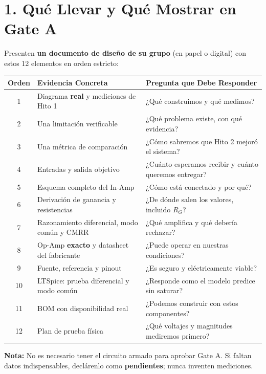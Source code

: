 \documentclass[10pt, a4paper]{article}
\begin{document}
\section*{1. Qué Llevar y Qué Mostrar en Gate A}
Presenten \textbf{un documento de diseño de su grupo} (en papel o digital) con estos 12 elementos en orden estricto:

\begin{table}[htbp]
    \centering
    \footnotesize
    \renewcommand{\arraystretch}{1.28}
    \begin{tabularx}{\textwidth}{|c|>{\raggedright\arraybackslash}p{5.5cm}|>{\raggedright\arraybackslash}X|}
    \hline
    \rowcolor[HTML]{EFEFEF} 
    \textbf{Orden} & \textbf{Evidencia Concreta} & \textbf{Pregunta que Debe Responder} \\ \hline
    1 & Diagrama \textbf{real} y mediciones de Hito 1 & ¿Qué construimos y qué medimos? \\ \hline
    2 & Una limitación verificable & ¿Qué problema existe, con qué evidencia? \\ \hline
    3 & Una métrica de comparación & ¿Cómo sabremos que Hito 2 mejoró el sistema? \\ \hline
    4 & Entradas y salida objetivo & ¿Cuánto esperamos recibir y cuánto queremos entregar? \\ \hline
    5 & Esquema completo del In-Amp & ¿Cómo está conectado y por qué? \\ \hline
    6 & Derivación de ganancia y resistencias & ¿De dónde salen los valores, incluido $R_G$? \\ \hline
    7 & Razonamiento diferencial, modo común y CMRR & ¿Qué amplifica y qué debería rechazar? \\ \hline
    8 & Op-Amp \textbf{exacto} y datasheet del fabricante & ¿Puede operar en nuestras condiciones? \\ \hline
    9 & Fuente, referencia y pinout & ¿Es seguro y eléctricamente viable? \\ \hline
    10 & LTSpice: prueba diferencial y modo común & ¿Responde como el modelo predice sin saturar? \\ \hline
    11 & BOM con disponibilidad real & ¿Podemos construir con estos componentes? \\ \hline
    12 & Plan de prueba física & ¿Qué voltajes y magnitudes mediremos primero? \\ \hline
    \end{tabularx}
\end{table}
\noindent\textbf{Nota:} No es necesario tener el circuito armado para aprobar Gate A. Si faltan datos indispensables, declárenlo como \textbf{pendientes}; nunca inventen mediciones.
\end{document}
